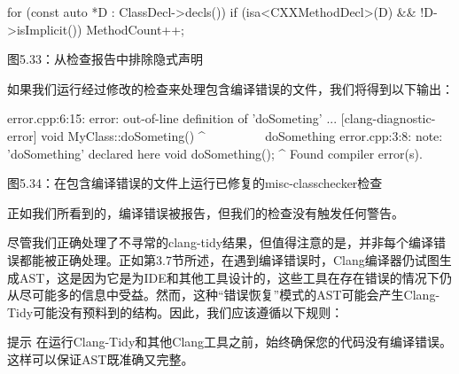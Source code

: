 \begin{cpp}
for (const auto *D : ClassDecl->decls()) {
  if (isa<CXXMethodDecl>(D) && !D->isImplicit())
    MethodCount++;
}
\end{cpp}


\begin{center}
图5.33：从检查报告中排除隐式声明
\end{center}

如果我们运行经过修改的检查来处理包含编译错误的文件，我们将得到以下输出：

\begin{shell}
error.cpp:6:15: error: out-of-line definition of 'doSometing' ...
[clang-diagnostic-error]
void MyClass::doSometing() {}
              ^~~~~~~~~~
doSomething
error.cpp:3:8: note: 'doSomething' declared here
  void doSomething();
       ^
Found compiler error(s).
\end{shell}

\begin{center}
图5.34：在包含编译错误的文件上运行已修复的misc-classchecker检查
\end{center}

正如我们所看到的，编译错误被报告，但我们的检查没有触发任何警告。

尽管我们正确处理了不寻常的clang-tidy结果，但值得注意的是，并非每个编译错误都能被正确处理。正如第3.7节所述，在遇到编译错误时，Clang编译器仍试图生成AST，这是因为它是为IDE和其他工具设计的，这些工具在存在错误的情况下仍从尽可能多的信息中受益。然而，这种“错误恢复”模式的AST可能会产生Clang-Tidy可能没有预料到的结构。因此，我们应该遵循以下规则：


\begin{myTip}{提示}
在运行Clang-Tidy和其他Clang工具之前，始终确保您的代码没有编译错误。这样可以保证AST既准确又完整。
\end{myTip}

